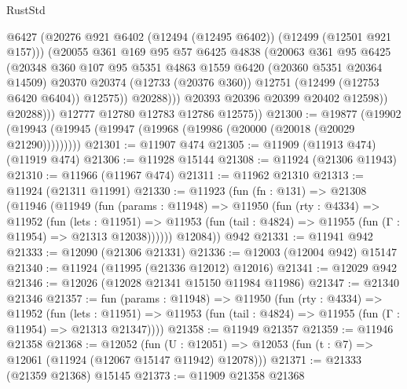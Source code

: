 \begin{lexlean}{RustStd}
\begin{coremodule}
{\begin{coremodule}
{{{{{{{{{{{{{{{{{{{{{{{{{{{{{{{{{{{{{{{{{{{{{{{{{{{{{{{{{{{{{{{{{{{{{{{{{{{{{{{{                      @6427
                      (@20276 @921 @6402 (@12494 (@12495 @6402)) (@12499 (@12501 @921 @157)))
                      (@20055
                        @361
                        @169
                        @95
                        @57
                        @6425
                        @4838
                        (@20063
                          @361
                          @95
                          @6425
                          (@20348
                            @360
                            @107
                            @95
                            @5351
                            @4863
                            @1559
                            @6420
                            (@20360 @5351 @20364 @14509)
                            @20370
                            @20374
                            (@12733 (@20376 @360))
                            @12751
                            (@12499 (@12753 @6420 @6404))
                            @12575))
                        @20288)))
                  @20393
                  @20396
                  @20399
                  @20402
                  @12598))
              @20288)))
        @12777
        @12780
        @12783
        @12786
        @12575))
@21300 := @19877
    (@19902 (@19943 (@19945 (@19947 (@19968 (@19986 (@20000 (@20018 (@20029 @21290)))))))))
@21301 := @11907 @474
@21305 := @11909 (@11913 @474) (@11919 @474)
@21306 := @11928 @15144
@21308 := @11924 (@21306 @11943)
@21310 := @11966 (@11967 @474)
@21311 := @11962 @21310
@21313 := @11924 (@21311 @11991)
@21330 := @11923
    (fun (fn : @131) =>
    @21308
      (@11946
        (@11949
          (fun (params : @11948) =>
          @11950
            (fun (rty : @4334) =>
            @11952
              (fun (lets : @11951) =>
              @11953 (fun (tail : @4824) => @11955 (fun (Γ : @11954) => @21313 @12038))))))
        @12084))
    @942
@21331 := @11941 @942
@21333 := @12090 (@21306 @21331)
@21336 := @12003 (@12004 @942) @15147
@21340 := @11924 (@11995 (@21336 @12012) @12016)
@21341 := @12029 @942
@21346 := @12026 (@12028 @21341 @15150 @11984 @11986)
@21347 := @21340 @21346
@21357 := fun (params : @11948) =>
  @11950
    (fun (rty : @4334) =>
    @11952
      (fun (lets : @11951) =>
      @11953 (fun (tail : @4824) => @11955 (fun (Γ : @11954) => @21313 @21347))))
@21358 := @11949 @21357
@21359 := @11946 @21358
@21368 := @12052
    (fun (U : @12051) => @12053 (fun (t : @7) => @12061 (@11924 (@12067 @15147 @11942) @12078)))
@21371 := @21333 (@21359 @21368) @15145
@21373 := @11909 @21358 @21368
}}}}}}}}}}}}}}}}}}}}}}}}}}}}}}}}}}}}}}}}}}}}}}}}}}}}}}}}}}}}}}}}}}}}}}}}}}}}}}}}
\end{coremodule}}
\end{coremodule}
\end{lexlean}
